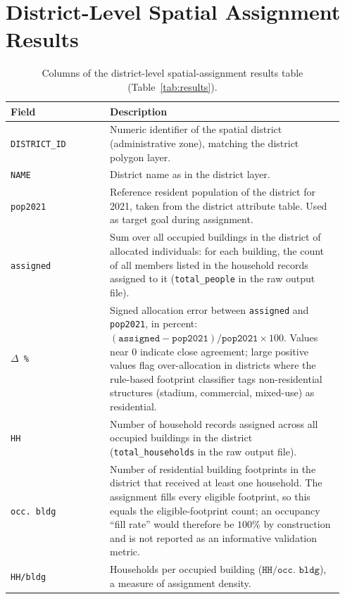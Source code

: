 \documentclass{article}
\begin{document}
\appendix
\section{District-Level Spatial Assignment Results}\label{app:district-table}

\begin{landscape}

\end{landscape}

\begin{table}[htbp]
  \centering
  \begin{tabular}{@{}p{0.28\linewidth}p{0.66\linewidth}@{}}
    \toprule
    \textbf{Field} & \textbf{Description} \\
    \midrule
    \texttt{DISTRICT\_ID} &
    Numeric identifier of the spatial district (administrative zone), matching the district polygon layer. \\
    \texttt{NAME} &
    District name as in the district layer. \\
    \texttt{pop2021} &
    Reference resident population of the district for 2021, taken from the district attribute table. Used as target goal during assignment. \\
    \texttt{assigned} &
    Sum over all occupied buildings in the district of allocated individuals: for each building, the count of all members listed in the household records assigned to it (\texttt{total\_people} in the raw output file). \\
    \texttt{$\Delta$\,\%} &
    Signed allocation error between \texttt{assigned} and \texttt{pop2021}, in percent:
    $(\texttt{assigned} - \texttt{pop2021}) / \texttt{pop2021}\times 100$.
    Values near $0$ indicate close agreement; large positive values flag over-allocation in districts where the rule-based footprint classifier tags non-residential structures (stadium, commercial, mixed-use) as residential. \\
    \texttt{HH} &
    Number of household records assigned across all occupied buildings in the district (\texttt{total\_households} in the raw output file). \\
    \texttt{occ.\ bldg} &
    Number of residential building footprints in the district that received at least one household. The assignment fills every eligible footprint, so this equals the eligible-footprint count; an occupancy ``fill rate'' would therefore be $100\%$ by construction and is not reported as an informative validation metric. \\
    \texttt{HH/bldg} &
    Households per occupied building ($\texttt{HH} / \texttt{occ.\ bldg}$), a measure of assignment density. \\
    \bottomrule
  \end{tabular}
    \caption{Columns of the district-level spatial-assignment results table (Table~\ref{tab:results}).}
    \label{tab:district_statistics_legend}
\end{table}



\end{document}
